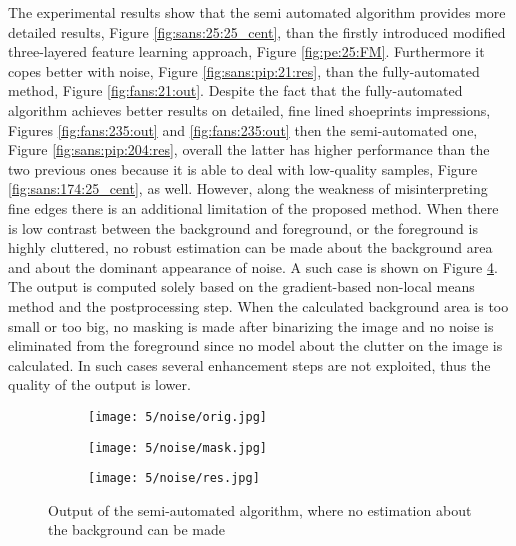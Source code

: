 \documentclass[draft,final]{vutinfth} %
\begin{document}
\par
The experimental results show that the semi automated algorithm provides more detailed results, Figure \ref{fig:sans:25:25_cent}, than the firstly introduced modified three-layered feature learning approach, Figure \ref{fig:pe:25:FM}.
Furthermore it copes better with noise, Figure \ref{fig:sans:pip:21:res}, than the fully-automated method, Figure \ref{fig:fans:21:out}.
Despite the fact that the fully-automated algorithm achieves better results on detailed, fine lined shoeprints impressions, Figures \ref{fig:fans:235:out} and \ref{fig:fans:235:out} then the semi-automated one, Figure \ref{fig:sans:pip:204:res}, overall the latter has higher performance than the two previous ones because it is able to deal with low-quality samples, Figure \ref{fig:sans:174:25_cent}, as well.
However, along the weakness of misinterpreting fine edges there is an additional limitation of the proposed method.
When there is low contrast between the background and foreground, or the foreground is highly cluttered, no robust estimation can be made about the background area and about the dominant appearance of noise.
A such case is shown on Figure \ref{fig:sans:noise}.
The output is computed solely based on the gradient-based non-local means method and the postprocessing step.
When the calculated background area is too small or too big, no masking is made after binarizing the image and no noise is eliminated from the foreground since no model about the clutter on the image is calculated.
In such cases several enhancement steps are not exploited, thus the quality of the output is lower.

\begin{figure}[h]
  \centering
  \begin{subfigure}[b]{0.3\columnwidth}
    \centering
    \texttt{[image: 5/noise/orig.jpg]}
    \label{fig:sans:noise:orig}
  \end{subfigure}
  \begin{subfigure}[b]{0.3\columnwidth}
    \centering
    \texttt{[image: 5/noise/mask.jpg]}
    \label{fig:sans:noise:mask}
  \end{subfigure}
  \begin{subfigure}[b]{0.3\columnwidth}
    \centering
   \texttt{[image: 5/noise/res.jpg]}
    \label{fig:sans:noise:res}
  \end{subfigure}
 
  \caption{Output of the semi-automated algorithm, where no estimation about the background can be made}
  \label{fig:sans:noise}
\end{figure}
\end{document}
